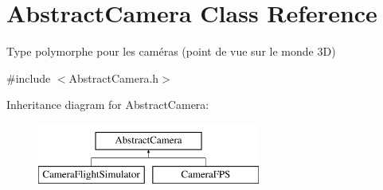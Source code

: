 \hypertarget{classAbstractCamera}{\section{Abstract\-Camera Class Reference}
\label{classAbstractCamera}
}


Type polymorphe pour les caméras (point de vue sur le monde 3\-D)  




{\ttfamily \#include $<$Abstract\-Camera.\-h$>$}

Inheritance diagram for Abstract\-Camera\-:\begin{figure}[H]
\begin{center}
\leavevmode
\includegraphics[height=2.000000cm]{classAbstractCamera}
\end{center}
\end{figure}
